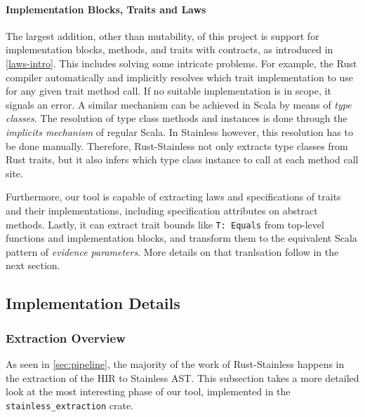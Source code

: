 \paragraph{Implementation Blocks, Traits and Laws}

The largest addition, other than mutability, of this project is support for
implementation blocks, methods, and traits with contracts, as introduced in
\autoref{laws-intro}. This includes solving some intricate problems. For
example, the Rust compiler automatically and implicitly resolves which trait
implementation to use for any given trait method call. If no suitable
implementation is in scope, it signals an error.  A similar mechanism can be
achieved in Scala by means of \emph{type classes}. The resolution of type class
methods and instances is done through the \emph{implicits mechanism} of regular
Scala. In Stainless however, this resolution has to be done manually. Therefore,
Rust-Stainless not only extracts type classes from Rust traits, but it also
infers which type class instance to call at each method call site.

Furthermore, our tool is capable of extracting laws and specifications of traits
and their implementations, including specification attributes on abstract
methods. Lastly, it can extract  trait bounds like \passthrough{\lstinline!T:
Equals!} from top-level functions and implementation blocks, and transform them
to the equivalent Scala pattern of \emph{evidence parameters}. More details on
that tranlsation follow in the next section.



\subsection{Implementation Details}

\subsubsection{Extraction Overview}
\label{sec:extraction-overview}

As seen in \autoref{sec:pipeline}, the majority of the work of Rust-Stainless
happens in the extraction of the HIR to Stainless AST. This subsection takes a
more detailed look at the most interesting phase of our tool, implemented in the
\lstinline!stainless_extraction! crate.

